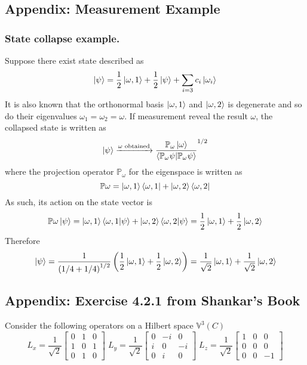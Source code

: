 \documentclass[../../../main.tex]{subfiles}
\begin{document}
\subsection{Appendix: Measurement Example}
\subsubsection{State collapse example.}
Suppose there exist  state described as
\begin{equation*}
    \ket{\psi}=\frac{1 }{2}\ket{\omega,1}+\frac{1 }{2}\ket{\psi}+\sum_{i=3} c_i \ket{\omega_i}
\end{equation*}
It is also known that the orthonormal basis $\ket{\omega,1  }$ and $\ket{\omega,2}$ is degenerate and so do their eigenvalues $\omega_1=\omega_2=\omega$.
If measurement reveal the result $\omega$, the collapsed state is written as
\begin{equation*}
    \ket{\psi}\xrightarrow{\omega\text{ obtained}}\frac{\mathbb{P}_\omega \ket{\omega }}{\braket{\mathbb{P}_\omega\psi|\mathbb{P }_\omega \psi}}^{1/2}
\end{equation*}
where the projection operator $\mathbb{P }_\omega$ for the eigenspace is written as
\begin{equation*}
    \mathbb{P }\omega=\ket{\omega,1}\bra{\omega,1}+\ket{\omega,2}\bra{\omega,2}
\end{equation*}
As such, its action on the state vector is
\begin{equation*}
    \mathbb{P }\omega \ket{\psi}=\ket{\omega,1}\braket{\omega,1|\psi}+\ket{\omega,2}\braket{\omega,2|\psi}
    =\frac{1 }{2 }\ket{\omega,1}+\frac{1 }{2 }\ket{\omega,2}
\end{equation*}
Therefore
\begin{equation*}
    \ket{\psi}=\frac{1}{\left( 1/4+1/4 \right) ^{1/2}}\left(\frac{1 }{2 }\ket{\omega,1}+\frac{1 }{2 }\ket{\omega,2}\right)
    =\frac{1 }{\sqrt{2} }\ket{\omega,1}+\frac{1 }{\sqrt{2} }\ket{\omega,2}
\end{equation*}

\subsection{Appendix: Exercise 4.2.1 from Shankar's Book}
Consider the following operators on a Hilbert space $\mathbb{V}^3(C)$
\begin{equation*}
    L_x=\frac{1 }{\sqrt{2 }}\begin{bmatrix}
        0 & 1 & 0 \\
        1 & 0 & 1 \\
        0 & 1 & 0
    \end{bmatrix}\;
    L_y=\frac{1 }{\sqrt{2 }}\begin{bmatrix}
        0 & -i & 0  \\
        i & 0  & -i \\
        0 & i  & 0
    \end{bmatrix}\;
    L_z=\frac{1 }{\sqrt{2 }}\begin{bmatrix}
        1 & 0 & 0  \\
        0 & 0 & 0  \\
        0 & 0 & -1
    \end{bmatrix}
\end{equation*}
\end{document}
